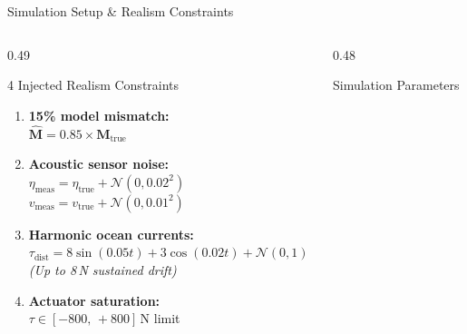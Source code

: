 \documentclass[aspectratio=169,10pt]{beamer}
\begin{document}
\begin{frame}{Simulation Setup \& Realism Constraints}

\small %

\begin{columns}[T, onlytextwidth]

\begin{column}{0.49\textwidth}

\begin{alertblock}{4 Injected Realism Constraints}

\begin{enumerate}[leftmargin=1.2em]

\item \textbf{15\% model mismatch:}\\
$\hat{\mathbf{M}} = 0.85 \times \mathbf{M}_\text{true}$

\item \textbf{Acoustic sensor noise:}\\
{\scriptsize
$\eta_\text{meas}
=
\eta_\text{true}
+
\mathcal{N}(0, 0.02^2)$\\
$v_\text{meas}
=
v_\text{true}
+
\mathcal{N}(0, 0.01^2)$}

\item \textbf{Harmonic ocean currents:}\\
{\scriptsize
$\tau_\text{dist}
=
8\sin(0.05t)
+
3\cos(0.02t)
+
\mathcal{N}(0,1)$}\\
\textit{\scriptsize (Up to 8\,N sustained drift)}

\item \textbf{Actuator saturation:}\\
$\tau \in [-800,\,+800]$\,N limit

\end{enumerate}

\end{alertblock}

\end{column}

\hfill

\begin{column}{0.48\textwidth}

\begin{block}{Simulation Parameters}


\end{block}
\end{column}
\end{columns}
\end{frame}
\end{document}
